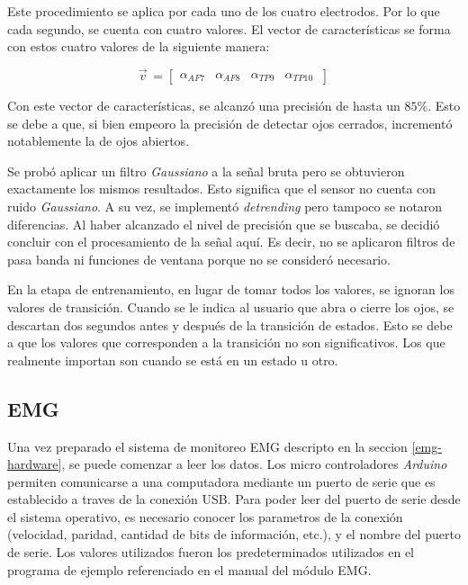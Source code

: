 Este procedimiento se aplica por cada uno de los cuatro electrodos. Por lo que cada segundo, se cuenta con cuatro valores. El vector de características se forma con estos cuatro valores de la siguiente manera:
 
\[
  \vec{v}^{\, }=
  \left[ {\begin{array}{cccc}
   \alpha_{AF7}  & \alpha_{AF8} & \alpha_{TP9} & \alpha_{TP10}  \     \end{array} } \right]
\] 

Con este vector de características, se alcanzó una precisión de hasta un $ 85 \%$. Esto se debe a que, si bien empeoro la precisión de detectar ojos cerrados, incrementó notablemente la de ojos abiertos.
 
 Se probó aplicar un filtro \emph{Gaussiano} a la señal bruta pero se obtuvieron exactamente los mismos resultados. Esto significa que el sensor no cuenta con ruido \emph{Gaussiano}. A su vez, se implementó \emph{detrending} pero tampoco se notaron diferencias. Al haber alcanzado el nivel de precisión que se buscaba, se decidió concluir con el procesamiento de la señal aquí. Es decir, no se aplicaron filtros de pasa banda ni funciones de ventana porque no se consideró necesario.
 
En la etapa de entrenamiento, en lugar de tomar todos los valores, se ignoran los valores de transición. Cuando se le indica al usuario que abra o cierre los ojos, se descartan dos segundos antes y después de la transición de estados. Esto se debe a que los valores que corresponden a la transición no son significativos. Los que realmente importan son cuando se está en un estado u otro.
 
\subsection{EMG} \label{sec:emg-signal-processing}

Una vez preparado el sistema de monitoreo EMG descripto en la seccion \ref{emg-hardware}, se puede comenzar a leer los datos. Los micro controladores \emph{Arduino} permiten comunicarse a una computadora mediante un puerto de serie que es establecido a traves de la conexión USB.  Para poder leer del puerto de serie desde el sistema operativo, es necesario conocer los parametros de la conexión (velocidad, paridad, cantidad de bits de información, etc.), y el nombre del puerto de serie. Los valores utilizados fueron los predeterminados utilizados en el programa de ejemplo referenciado en el manual del módulo EMG\cite{olimex-manual}.

